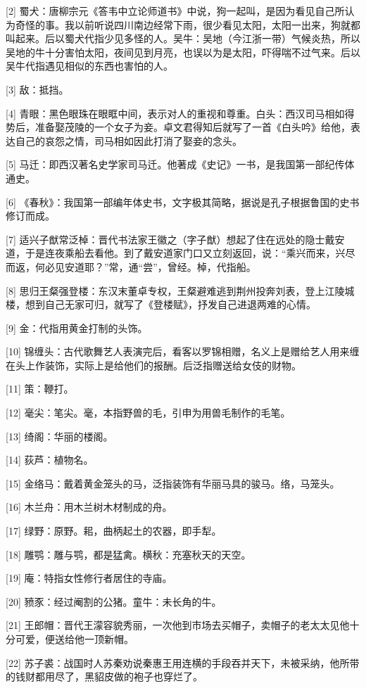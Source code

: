 \documentclass[12pt,UTF8]{ctexbook}
\begin{document}
[2] 蜀犬：唐柳宗元《答韦中立论师道书》中说，狗一起叫，是因为看见自己所认为奇怪的事。我以前听说四川南边经常下雨，很少看见太阳，太阳一出来，狗就都叫起来。后以蜀犬代指少见多怪的人。吴牛：吴地（今江浙一带）气候炎热，所以吴地的牛十分害怕太阳，夜间见到月亮，也误以为是太阳，吓得喘不过气来。后以吴牛代指遇见相似的东西也害怕的人。

[3] 敌：抵挡。

[4] 青眼：黑色眼珠在眼眶中间，表示对人的重视和尊重。白头：西汉司马相如得势后，准备娶茂陵的一个女子为妾。卓文君得知后就写了一首《白头吟》给他，表达自己的哀怨之情，司马相如因此打消了娶妾的念头。

[5] 马迁：即西汉著名史学家司马迁。他著成《史记》一书，是我国第一部纪传体通史。

[6] 《春秋》：我国第一部编年体史书，文字极其简略，据说是孔子根据鲁国的史书修订而成。

[7] 适兴子猷常泛棹：晋代书法家王徽之（字子猷）想起了住在远处的隐士戴安道，于是连夜乘船去看他。到了戴安道家门口又立刻返回，说：“乘兴而来，兴尽而返，何必见安道耶？”常，通“尝”，曾经。棹，代指船。

[8] 思归王粲强登楼：东汉末董卓专权，王粲避难逃到荆州投奔刘表，登上江陵城楼，想到自己无家可归，就写了《登楼赋》，抒发自己进退两难的心情。

[9] 金：代指用黄金打制的头饰。

[10] 锦缠头：古代歌舞艺人表演完后，看客以罗锦相赠，名义上是赠给艺人用来缠在头上作装饰，实际上是给他们的报酬。后泛指赠送给女伎的财物。

[11] 策：鞭打。

[12] 毫尖：笔尖。毫，本指野兽的毛，引申为用兽毛制作的毛笔。

[13] 绮阁：华丽的楼阁。

[14] 荻芦：植物名。

[15] 金络马：戴着黄金笼头的马，泛指装饰有华丽马具的骏马。络，马笼头。

[16] 木兰舟：用木兰树木材制成的舟。

[17] 绿野：原野。耜，曲柄起土的农器，即手犁。

[18] 雕鹗：雕与鹗，都是猛禽。横秋：充塞秋天的天空。

[19] 庵：特指女性修行者居住的寺庙。

[20] 豮豕：经过阉割的公猪。童牛：未长角的牛。

[21] 王郎帽：晋代王濛容貌秀丽，一次他到市场去买帽子，卖帽子的老太太见他十分可爱，便送给他一顶新帽。

[22] 苏子裘：战国时人苏秦劝说秦惠王用连横的手段吞并天下，未被采纳，他所带的钱财都用尽了，黑貂皮做的袍子也穿烂了。
\end{document}
